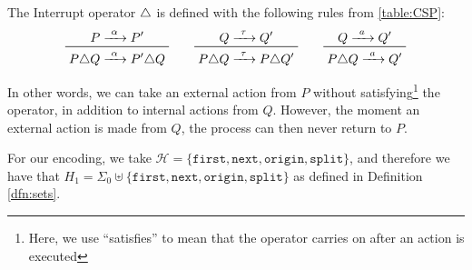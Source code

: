 \documentclass[../hons_project.tex]{subfiles}
\begin{document}
The Interrupt operator $\triangle$ is defined with the following rules from \cref{table:CSP}:
\[\prftree{P \prightarrow{\alpha} P'}{P \interrupt Q \prightarrow{\alpha} P' \interrupt Q} \qquad \prftree{Q \prightarrow{\tau} Q'}{P \interrupt Q \prightarrow{\tau} P \interrupt Q'} \qquad \prftree{Q \prightarrow{a} Q'}{P \interrupt Q \prightarrow{a} Q'}\]

In other words, we can take an external action from $P$ without satisfying\footnote{Here, we use ``satisfies'' to mean that the operator carries on after an action is executed} the operator, in addition to internal actions from $Q$. However, the moment an external action is made from $Q$, the process can then never return to $P$.

For our encoding, we take $\mathscr{H} = \{\mathtt{first}, \mathtt{next}, \mathtt{origin}, \mathtt{split}\}$, and therefore we have that $H_{1} = \Sigma_{0} \uplus \{\mathtt{first}, \mathtt{next}, \mathtt{origin}, \mathtt{split}\}$ as defined in Definition \ref{dfn:sets}.
\end{document}
